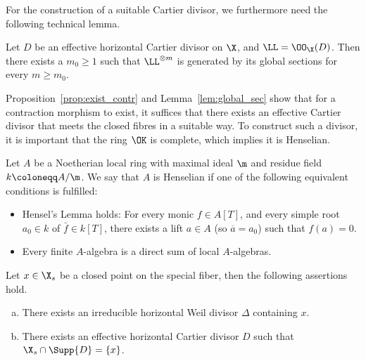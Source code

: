 For the construction of a suitable Cartier divisor, we furthermore need the following technical lemma.

\begin{lemma} \label{lem:global_sec}
    Let $D$ be an effective horizontal Cartier divisor on $\X$, and $\LL = \OO_\X(D)$.
    Then there exists a $m_0 \geq 1$ such that $\LL^{\otimes m}$ is generated by its global sections for every $m \geq m_0$.
\end{lemma}

Proposition~\ref{prop:exist_contr} and Lemma~\ref{lem:global_sec} show that for a contraction morphism to exist,
it suffices that there exists an effective Cartier divisor that meets the closed fibres in a suitable way.
To construct such a divisor, it is important that the ring $\OK $ is complete, which implies it is Henselian.

\begin{definition} %
    Let $A$ be a Noetherian local ring with maximal ideal $\m$ and residue field $k \coloneqq A/\m$.
    We say that $A$ is Henselian if one of the following equivalent conditions is fulfilled:
    \begin{itemize}
        \item Hensel's Lemma holds: For every monic $f \in A[T]$, and every simple root $a_0 \in k$ of $\bar{f} \in k[T]$,
            there exists a lift $a \in A$ (so $\overline{a} = a_0$) such that $f(a) = 0$.
        \item Every finite $A$-algebra is a direct sum of local $A$-algebras.
    \end{itemize}
\end{definition}

\begin{lemma} \label{lem:exist_div}
    Let $x \in \X_s$ be a closed point on the special fiber, then the following assertions hold.
    \begin{enumerate}[(a)]
        \item There exists an irreducible horizontal Weil divisor $\Delta$ containing $x$. \label{lem:exist_div_i}
        \item There exists an effective horizontal Cartier divisor $D$ such that $\X_s \cap \Supp{D} = \{x\}$. \label{lem:exist_div_ii}
    \end{enumerate}
\end{lemma}

